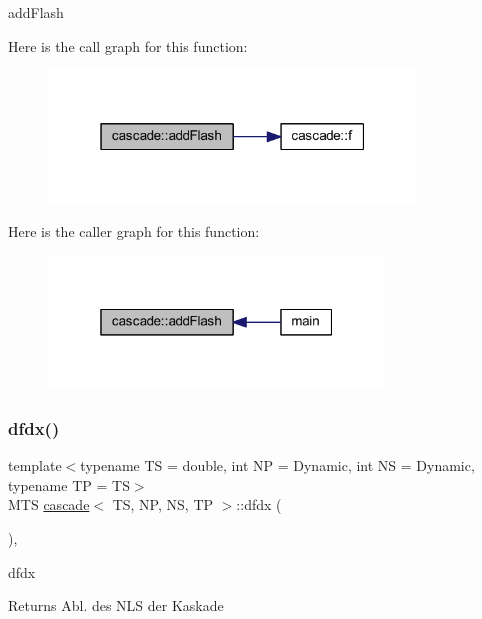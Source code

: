 add\+Flash 

Here is the call graph for this function\+:\nopagebreak
\begin{figure}[H]
\begin{center}
\leavevmode
\includegraphics[width=277pt]{classcascade_ae1aae44e18b9d87cb710c54726726baa_cgraph}
\end{center}
\end{figure}
Here is the caller graph for this function\+:\nopagebreak
\begin{figure}[H]
\begin{center}
\leavevmode
\includegraphics[width=253pt]{classcascade_ae1aae44e18b9d87cb710c54726726baa_icgraph}
\end{center}
\end{figure}
\mbox{\label{classcascade_ac72705f0ad01cc88d43c002d63acce13}} 
\subsubsection{\texorpdfstring{dfdx()}{dfdx()}}
{\footnotesize\ttfamily template$<$typename TS = double, int NP = Dynamic, int NS = Dynamic, typename TP = TS$>$ \\
M\+TS \mbox{\hyperlink{classcascade}{cascade}}$<$ TS, NP, NS, TP $>$\+::dfdx (\begin{DoxyParamCaption}{ }\end{DoxyParamCaption})\hspace{0.3cm}{\ttfamily [inline]}, {\ttfamily [virtual]}}



dfdx 

\begin{DoxyReturn}{Returns}
Abl. des N\+LS der Kaskade 
\end{DoxyReturn}


